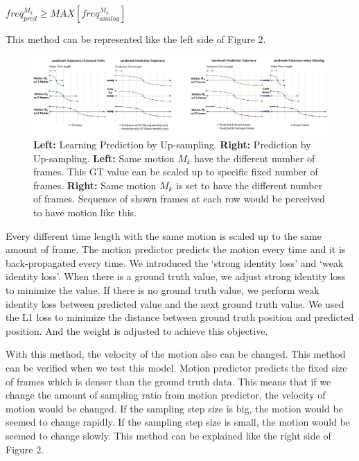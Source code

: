\documentclass[10pt,twocolumn,letterpaper]{article}
\begin{document}
\bigskip
\begin{center}
$freq_{pred}^{M_k} \geq MAX[freq_{analog}^{M_k}] $
\end{center}
\bigskip

This method can be represented like the left side of Figure 2.

\begin{figure}
\begin{center}
\includegraphics [scale=0.38] {images/upsample.jpg}
\end{center}
 \caption{\textbf{Left:} Learning Prediction by Up-sampling. \textbf{Right:} Prediction by Up-sampling. \textbf{Left:} Same motion $M_k$ have the different number of frames. This GT value can be scaled up to specific fixed number of frames. \textbf{Right:} Same motion $M_k$ is set to have the different number of frames. Sequence of shown frames at each row would be perceived to have motion like this.}
\label{fig:short}
\end{figure}

Every different time length with the same motion is scaled up to the same amount of frame. The motion predictor predicts the motion every time and it is back-propagated every time. We introduced the ‘strong identity loss’ and ‘weak identity loss’. When there is a ground truth value, we adjust strong identity loss to minimize the value. If there is no ground truth value, we perform weak identity loss between predicted value and the next ground truth value. We used the L1 loss to minimize the distance between ground truth position and predicted position. And the weight is adjusted to achieve this objective.

With this method, the velocity of the motion also can be changed. This method can be verified when we test this model. Motion predictor predicts the fixed size of frames which is denser than the ground truth data. This means that if we change the amount of sampling ratio from motion predictor, the velocity of motion would be changed. If the sampling step size is big, the motion would be seemed to change rapidly. If the sampling step size is small, the motion would be seemed to change slowly. This method can be explained like the right side of Figure 2.
\end{document}
